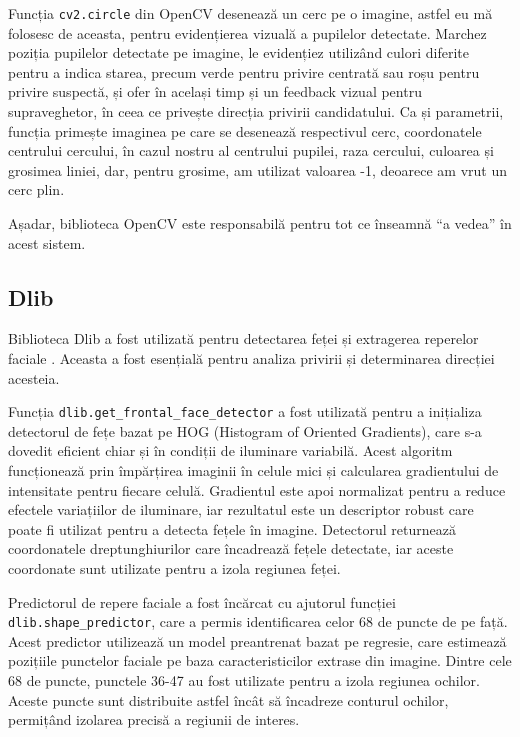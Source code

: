 \documentclass[12pt,a4paper]{article}
\begin{document}
Funcția \texttt{cv2.circle} din OpenCV desenează un cerc pe o imagine, astfel eu
mă folosesc de aceasta, pentru evidențierea vizuală a pupilelor
detectate. Marchez poziția pupilelor detectate pe imagine, le evidențiez
utilizând culori diferite pentru a indica starea, precum verde pentru
privire centrată sau roșu pentru privire suspectă, și ofer în același
timp și un feedback vizual pentru supraveghetor, în ceea ce privește
direcția privirii candidatului. Ca și parametrii, funcția primește
imaginea pe care se desenează respectivul cerc, coordonatele centrului
cercului, în cazul nostru al centrului pupilei, raza cercului, culoarea
și grosimea liniei, dar, pentru grosime, am utilizat valoarea -1,
deoarece am vrut un cerc plin.

Așadar, biblioteca OpenCV este responsabilă pentru tot ce înseamnă ``a
vedea'' în acest sistem.

\subsection{Dlib}
Biblioteca Dlib a fost utilizată pentru detectarea feței și extragerea reperelor faciale \cite{dlib}. Aceasta a fost esențială pentru analiza privirii și determinarea direcției acesteia. 

Funcția \texttt{dlib.get\_frontal\_face\_detector} a fost utilizată pentru a inițializa detectorul de fețe bazat pe HOG (Histogram of Oriented Gradients), care s-a dovedit eficient chiar și în condiții de iluminare variabilă. Acest algoritm funcționează prin împărțirea imaginii în celule mici și calcularea gradientului de intensitate pentru fiecare celulă. Gradientul este apoi normalizat pentru a reduce efectele variațiilor de iluminare, iar rezultatul este un descriptor robust care poate fi utilizat pentru a detecta fețele în imagine. Detectorul returnează coordonatele dreptunghiurilor care încadrează fețele detectate, iar aceste coordonate sunt utilizate pentru a izola regiunea feței.

Predictorul de repere faciale a fost încărcat cu ajutorul funcției \texttt{dlib.shape\_predictor}, care a permis identificarea celor 68 de puncte de pe față. Acest predictor utilizează un model preantrenat bazat pe regresie, care estimează pozițiile punctelor faciale pe baza caracteristicilor extrase din imagine. Dintre cele 68 de puncte, punctele 36-47 au fost utilizate pentru a izola regiunea ochilor. Aceste puncte sunt distribuite astfel încât să încadreze conturul ochilor, permițând izolarea precisă a regiunii de interes.
\end{document}
